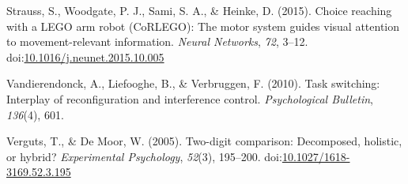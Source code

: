 \documentclass[english,man]{apa6}
\theoremstyle{definition}
\theoremstyle{definition}
\theoremstyle{definition}
\theoremstyle{remark}
\begin{document}
\hypertarget{ref-strauss2015}{}
Strauss, S., Woodgate, P. J., Sami, S. A., \& Heinke, D. (2015). Choice
reaching with a LEGO arm robot (CoRLEGO): The motor system guides visual
attention to movement-relevant information. \emph{Neural Networks},
\emph{72}, 3--12.
doi:\href{https://doi.org/10.1016/j.neunet.2015.10.005}{10.1016/j.neunet.2015.10.005}

\hypertarget{ref-vandierendonck2010}{}
Vandierendonck, A., Liefooghe, B., \& Verbruggen, F. (2010). Task
switching: Interplay of reconfiguration and interference control.
\emph{Psychological Bulletin}, \emph{136}(4), 601.

\hypertarget{ref-verguts2005}{}
Verguts, T., \& De Moor, W. (2005). Two-digit comparison: Decomposed,
holistic, or hybrid? \emph{Experimental Psychology}, \emph{52}(3),
195--200.
doi:\href{https://doi.org/10.1027/1618-3169.52.3.195}{10.1027/1618-3169.52.3.195}
\end{document}
